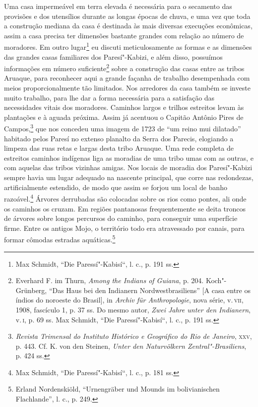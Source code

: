 Uma casa impermeável em terra elevada é necessária para o secamento das
provisões e dos utensílios durante as longas épocas de chuva, e uma vez
que toda a construção mediana da casa é destinada às mais diversas
execuções econômicas, assim a casa precisa ter dimensões bastante
grandes com relação ao número de moradores. Em outro lugar\footnote{Max
  Schmidt, ``Die Paressí"-Kabisí``, l. c., p. 191 ss.} eu discuti
meticulosamente as formas e as dimensões das grandes casas familiares
dos Paresí"-Kabizi, e além disso, possuímos informações em número
suficiente\footnote{Everhard F. im Thurn, \emph{Among the Indians of
  Guiana}, p. 204. Koch"-Grünberg, ``Das Haus bei den Indianern
  Nordwestbrasiliens'' {[}A casa entre os índios do noroeste do
  Brasil{]}, in \emph{Archiv für Anthropologie}, nova série, v.\,\textsc{vii},
  1908, fascículo 1, p. 37 ss. Do mesmo autor, \emph{Zwei Jahre unter
  den Indianern}, v.\,\textsc{i}, p. 69 ss. Max Schmidt, ``Die Paressí"-Kabisí``,
  l. c., p. 191 ss.} sobre a construção das casas entre as tribos
Aruaque, para reconhecer aqui a grande façanha de trabalho desempenhada
com meios proporcionalmente tão limitados. Nos arredores da casa também
se investe muito trabalho, para lhe dar a forma necessária para a
satisfação das necessidades vitais dos moradores. Caminhos largos e
trilhos estreitos levam às plantações e à aguada próxima. Assim já
acentuou o Capitão Antônio Pires de Campos,\footnote{\emph{Revista
  Trimensal do Instituto Histórico e Geográfico do Rio de Janeiro}, \textsc{xxv},
  p. 443. Cf. K. von den Steinen, \emph{Unter den Naturvölkern
  Zentral"-Brasiliens}, p. 424 ss.} que nos concedeu uma imagem de 1723
de ``um reino mui dilatado'' habitado pelos Paresí no extenso planalto
da Serra dos Parecis, elogiando a limpeza das ruas retas e largas desta
tribo Aruaque. Uma rede completa de estreitos caminhos indígenas liga as
moradias de uma tribo umas com as outras, e com aquelas das tribos
vizinhas amigas. Nos locais de moradia dos Paresí"-Kabizi sempre havia um
lugar adequado na nascente principal, que corre nas redondezas,
artificialmente estendido, de modo que assim se forjou um local de banho
razoável.\footnote{Max Schmidt, ``Die Paressí"-Kabisí``, l. c., p. 181 ss.}
Árvores derrubadas são colocadas sobre os rios como pontes, ali onde os
caminhos os cruzam. Em regiões pantanosas frequentemente se deita
troncos de árvores sobre longos percursos do caminho, para conseguir uma
superfície firme. Entre os antigos Mojo, o território todo era
atravessado por canais, para formar cômodas estradas aquáticas.\footnote{Erland
  Nordenskiöld, ``Urnengräber und Mounds im bolivianischen Flachlande'',
  l. c., p. 249.}

